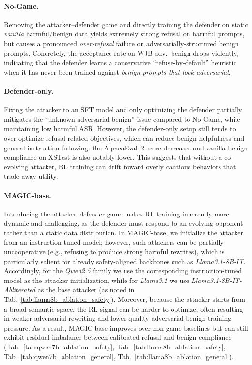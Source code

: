 \documentclass[11pt, letterpaper]{template}
\theoremstyle{plain}
\theoremstyle{definition}
\theoremstyle{remark}
\begin{document}
\paragraph{No-Game.}
Removing the attacker--defender game and directly training the defender on static \emph{vanilla} harmful/benign data yields extremely strong refusal on harmful prompts, but causes a pronounced \emph{over-refusal} failure on adversarially-structured benign prompts. Concretely, the acceptance rate on WJB adv.\ benign drops violently, indicating that the defender learns a conservative ``refuse-by-default'' heuristic when it has never been trained against \emph{benign prompts that look adversarial}. 

\paragraph{Defender-only.}
Fixing the attacker to an SFT model and only optimizing the defender partially mitigates the ``unknown adversarial benign'' issue compared to No-Game, while maintaining low harmful ASR. However, the defender-only setup still tends to over-optimize refusal-related objectives, which can reduce benign helpfulness and general instruction-following: the AlpacaEval~2 score decreases and vanilla benign compliance on XSTest is also notably lower. This suggests that without a co-evolving attacker, RL training can drift toward overly cautious behaviors that trade away utility.

\paragraph{MAGIC-base.} 
Introducing the attacker--defender game makes RL training inherently more dynamic and challenging, as the defender must respond to an evolving opponent rather than a static data distribution. In MAGIC-base, we initialize the attacker from an instruction-tuned model; however, such attackers can be partially uncooperative (e.g., refusing to produce strong harmful rewrites), which is particularly salient for already safety-aligned backbones such as \textit{Llama3.1-8B-IT}. Accordingly, for the \textit{Qwen2.5} family we use the corresponding instruction-tuned model as the attacker initialization, while for \textit{Llama3.1} we use \textit{Llama3.1-8B-IT-Abliterated} as the base attacker (as noted in Tab.~\ref{tab:llama8b_ablation_safety}). Moreover, because the attacker starts from a broad semantic space, the RL signal can be harder to optimize, often resulting in weaker adversarial rewriting and lower-quality adversarial-benign training pressure. As a result, MAGIC-base improves over non-game baselines but can still exhibit residual imbalance between calibrated refusal and benign compliance (Tab.~\ref{tab:qwen7b_ablation_safety}, Tab.~\ref{tab:llama8b_ablation_safety}, Tab.~\ref{tab:qwen7b_ablation_general}, Tab.~\ref{tab:llama8b_ablation_general}).
\end{document}
